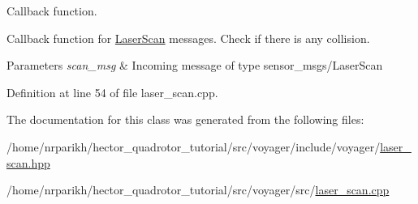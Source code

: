 Callback function. 

Callback function for \hyperlink{class_laser_scan}{Laser\+Scan} messages. Check if there is any collision.


\begin{DoxyParams}{Parameters}
{\em scan\+\_\+msg} & Incoming message of type sensor\+\_\+msgs/\+Laser\+Scan \\
\hline
\end{DoxyParams}


Definition at line 54 of file laser\+\_\+scan.\+cpp.



The documentation for this class was generated from the following files\+:\begin{DoxyCompactItemize}
\item 
/home/nrparikh/hector\+\_\+quadrotor\+\_\+tutorial/src/voyager/include/voyager/\hyperlink{laser__scan_8hpp}{laser\+\_\+scan.\+hpp}\item 
/home/nrparikh/hector\+\_\+quadrotor\+\_\+tutorial/src/voyager/src/\hyperlink{laser__scan_8cpp}{laser\+\_\+scan.\+cpp}\end{DoxyCompactItemize}
